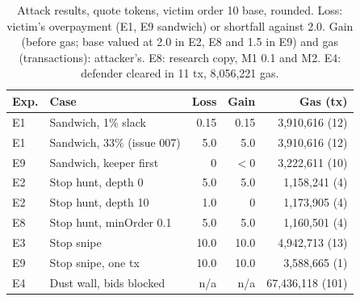\begin{table}[t]
\caption{Attack results, quote tokens, victim order 10 base, rounded. Loss: victim's overpayment (E1, E9 sandwich) or shortfall against 2.0. Gain (before gas; base valued at 2.0 in E2, E8 and 1.5 in E9) and gas (transactions): attacker's. E8: research copy, M1 0.1 and M2. E4: defender cleared in 11 tx, 8{,}056{,}221 gas.}
\label{tab:experiments}
\centering
\scriptsize
\setlength{\tabcolsep}{4pt}
\begin{tabular}{@{}llrrr@{}}
\toprule
Exp. & Case & Loss & Gain & Gas (tx) \\
\midrule
E1 & Sandwich, 1\% slack & 0.15 & 0.15 & 3{,}910{,}616 (12) \\ %
E1 & Sandwich, 33\% (issue 007) & 5.0 & 5.0 & 3{,}910{,}616 (12) \\ %
E9 & Sandwich, keeper first & 0 & $<0$ & 3{,}222{,}611 (10) \\ %
E2 & Stop hunt, depth 0 & 5.0 & 5.0 & 1{,}158{,}241 (4) \\ %
E2 & Stop hunt, depth 10 & 1.0 & 0 & 1{,}173{,}905 (4) \\ %
E8 & Stop hunt, minOrder 0.1 & 5.0 & 5.0 & 1{,}160{,}501 (4) \\ %
E3 & Stop snipe & 10.0 & 10.0 & 4{,}942{,}713 (13) \\ %
E9 & Stop snipe, one tx & 10.0 & 10.0 & 3{,}588{,}665 (1) \\ %
E4 & Dust wall, bids blocked & n/a & n/a & 67{,}436{,}118 (101) \\ %
\bottomrule
\end{tabular}
\end{table}
